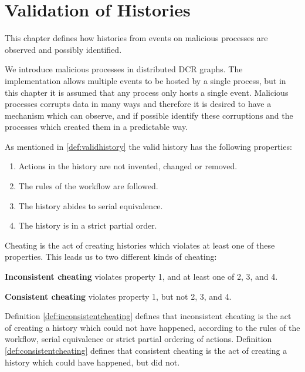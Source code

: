 \chapter{Validation of Histories}\label{chap:validation}
	This chapter defines how histories from events on malicious processes are observed and possibly identified.
	
	\newpar We introduce malicious processes in distributed DCR graphs. The implementation allows multiple events to be hosted by a single process, but in this chapter it is assumed that any process only hosts a single event. Malicious processes corrupts data in many ways and therefore it is desired to have a mechanism which can observe, and if possible identify these corruptions and the processes which created them in a predictable way. 
    
    \newpar As mentioned in \autoref{def:validhistory} the valid history has the following properties:
    
    \begin{enumerate}
    	\item Actions in the history are not invented, changed or removed.
    	\item The rules of the workflow are followed.
    	\item The history abides to serial equivalence.
    	\item The history is in a strict partial order.
    \end{enumerate}
	
	\noindent Cheating is the act of creating histories which violates at least one of these properties. This leads us to two different kinds of cheating:
	
	\begin{definition}
		\textbf{Inconsistent cheating} violates property 1, and at least one of 2, 3, and 4.
		\label{def:inconsistentcheating}
	\end{definition}
	
	\begin{definition}
		\textbf{Consistent cheating} violates property 1, but not 2, 3, and 4.
		\label{def:consistentcheating}
	\end{definition}
	
	\noindent Definition \ref{def:inconsistentcheating} defines that inconsistent cheating is the act of creating a history which could not have happened, according to the rules of the workflow, serial equivalence or strict partial ordering of actions. Definition \ref{def:consistentcheating} defines that consistent cheating is the act of creating a history which could have happened, but did not.
	
